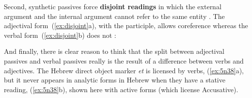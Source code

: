 \begin{exe}
\begin{xlist}
\begin{exe}
\begin{xlist}
\begin{exe}
\begin{exe}
\begin{xlist}
\begin{exe}
\begin{exe}
\begin{xlist}
\begin{exe}
\begin{xlist}
\begin{exe}
\begin{xlist}
\begin{exe}
\begin{xlist}
\begin{exe}
\begin{xlist}
\begin{xlist}
\begin{exe}
\begin{xlist}
\begin{exe}
\begin{xlist}
\begin{exe}
\begin{exe}
\begin{exe}
\begin{xlist}
\begin{exe}
\begin{exe}
\begin{xlist}
\begin{exe}
\begin{xlist}
\begin{exe}
\begin{xlist}
\begin{exe}
\begin{xlist}
\begin{xlist}
\begin{exe}
\begin{xlist}
\begin{exe}
\begin{xlist}
Second, synthetic passives force \textbf{disjoint readings} in which the external argument and the internal argument cannot refer to the same entity \citep{bakeretal89}. The adjectival form~(\ref{ex:disjoint}a), with the participle, allows coreference whereas the verbal form~(\ref{ex:disjoint}b) does not \citep[720]{sichel09}:
 \begin{exe}
 \ex  \label{ex:disjoint} 
 \begin{xlist} 
        
        
 \z
\z 

And finally, there is clear reason to think that the split between adjectival passives and verbal passives really is the result of a difference between verbs and adjectives. The Hebrew direct object marker \emph{et} is licensed by verbs, (\ref{ex:5n38}a), but it never appears in analytic forms in Hebrew when they have a stative reading, (\ref{ex:5n38}b), shown here with active forms (which license Accusative). 
 \begin{exe}
 \ex  \label{ex:5n38}
 \begin{xlist} 
			

\end{xlist}
\end{exe}
\end{xlist}
\end{exe}
\end{xlist}
\end{exe}
\end{xlist}
\end{exe}
\end{xlist}
\end{xlist}
\end{exe}
\end{xlist}
\end{exe}
\end{xlist}
\end{exe}
\end{xlist}
\end{exe}
\end{exe}
\end{xlist}
\end{exe}
\end{exe}
\end{exe}
\end{xlist}
\end{exe}
\end{xlist}
\end{exe}
\end{xlist}
\end{xlist}
\end{exe}
\end{xlist}
\end{exe}
\end{xlist}
\end{exe}
\end{xlist}
\end{exe}
\end{xlist}
\end{exe}
\end{exe}
\end{xlist}
\end{exe}
\end{exe}
\end{xlist}
\end{exe}
\end{xlist}
\end{exe}
